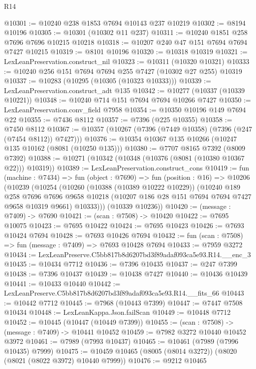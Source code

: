 \begin{lexlean}{R14}
\begin{coremodule}
@10301 := @10240 @238 @1853 @7694 @10143 @237 @10219
@10302 := @8194 @10196
@10305 := @10301 (@10302 @11 @237)
@10311 := @10240 @1851 @258 @7696 @7696 @10215 @10218
@10318 := @10207 @240 @47 @151 @7694 @7694 @7427 @10215
@10319 := @8101 @10196
@10320 := @10318 @10319
@10321 := LexLeanPreservation.construct_nil
@10323 := @10311 (@10320 @10321)
@10333 := @10240 @256 @151 @7694 @7694 @255 @7427 (@10302 @27 @255) @10319
@10337 := @10283 (@10295 (@10305 (@10323 @10333)))
@10339 := LexLeanPreservation.construct_adt @135
@10342 := @10277 (@10337 (@10339 @10221))
@10348 := @10240 @714 @151 @7694 @7694 @10266 @7427
@10350 := LexLeanPreservation.conv_field @7958
@10354 := @10350 @10196 @149 @7694 @22
@10355 := @7436 @8112
@10357 := @7396 (@225 @10355)
@10358 := @7450 @8112
@10367 := @10357 (@10267 (@7396 (@7449 @10358) (@7396 (@247 (@7454 @8112)) @7427)))
@10376 := @10354 @10367 @135 @10266 (@10247 @135 @10162 (@8081 (@10250 @135)))
@10380 := @7707 @8165 @7392 (@8009 @7392)
@10388 := @10271 (@10342 (@10348 (@10376 (@8081 (@10380 @10367 @22))) @10319))
@10389 := LexLeanPreservation.construct_cons
@10419 := fun (machine : @7434) =>
  fun (object : @7690) =>
  fun (position : @16) =>
  @10206
    (@10239
      (@10254
        (@10260
          (@10388 (@10389 @10222 @10229))
          (@10240
            @189
            @258
            @7696
            @7696
            @9658
            @10218
            (@10207 @186 @28 @151 @7694 @7694 @7427 @9658 @10319 @9661)
            @10333)))
      (@10339 @10236))
@10420 := (message : @7409) -> @7690
@10421 := (scan : @7508) -> @10420
@10422 := @7695 @10075
@10423 := @7695 @10422
@10424 := @7695 @10423
@10426 := @7693 @10424 @7694
@10428 := @7693 @10426 @7694
@10432 := fun (scan : @7508) => fun (message : @7409) => @7693 @10428 @7694
@10433 := @7959 @3272
@10434 := LexLeanPreserve.C5bb817b8d6207bd3f89adaf093ca5e93.R14.__enc_3
@10435 := @10434 @7712
@10436 := @7396 @10435
@10437 := @247 @7399
@10438 := @7396 @10437
@10439 := @10438 @7427
@10440 := @10436 @10439
@10441 := @10433 @10440
@10442 := LexLeanPreserve.C5bb817b8d6207bd3f89adaf093ca5e93.R14.__fits_66
@10443 := @10442 @7712
@10445 := @7968 (@10443 @7399)
@10447 := @7447 @7508 @10434
@10448 := LexLeanKappa.Json.failScan
@10449 := @10448 @7712
@10452 := @10445 (@10447 (@10449 @7399))
@10455 := (scan : @7508) -> (message : @7409) -> @10441 @10452
@10459 := @7982 @3272 @10440 @10452 @3972
@10461 := @7989 (@7993 @10437)
@10465 := @10461 (@7989 (@7996 @10435) @7999)
@10475 := @10459 @10465 (@8005 (@8014 @3272)) (@8020 (@8021 (@8022 @3972) @10440 @7999))
@10476 := @9212 @10465

\end{coremodule}
\end{lexlean}

